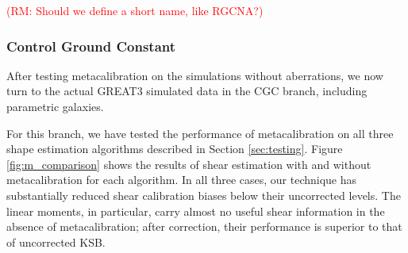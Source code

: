 \documentclass[iop]{emulateapj}
\newcommand\rmcomment[1]{\textcolor{red}{(RM: #1)}}
\begin{document}
\rmcomment{Should we define a short name, like RGCNA?}

\subsubsection{Control Ground Constant}

After testing metacalibration on the simulations without aberrations,
we now turn to the actual GREAT3 simulated data in the CGC branch,
including parametric galaxies.

For this branch, we have tested the performance of metacalibration on all
three shape estimation algorithms described in Section
\ref{sec:testing}. Figure \ref{fig:m_comparison} shows the results of
shear estimation with and without metacalibration for each
algorithm. In all three cases, our technique has substantially reduced
shear calibration biases below their uncorrected levels. The linear
moments, in particular, carry almost no useful shear information in the
absence of metacalibration; after correction, their performance is
superior to that of uncorrected KSB.
\end{document}
